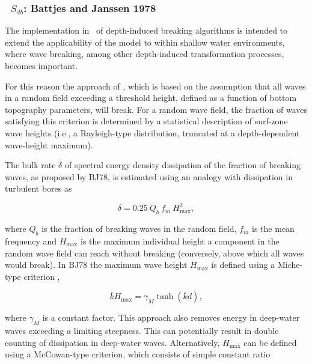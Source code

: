 \vsssub
\subsubsection{~$S_{db}$: Battjes and  Janssen 1978} \label{sec:DB1}
\vsssub


\noindent
The implementation in \ws\ of depth-induced breaking algorithms is intended to
extend the applicability of the model to within shallow water environments,
where wave breaking, among other depth-induced transformation processes,
becomes important.

For this reason the approach of \citet[][henceforth denoted as
BJ78]{pro:BJ78}, which is based on the assumption that all waves in a random
field exceeding a threshold height, defined as a function of bottom topography
parameters, will break. For a random wave field, the fraction of waves
satisfying this criterion is determined by a statistical description of
surf-zone wave heights (i.e., a Rayleigh-type distribution, truncated at a
depth-dependent wave-height maximum).

The bulk rate $\delta$ of spectral energy density dissipation of the fraction
of breaking waves, as proposed by BJ78, is estimated using an analogy with
dissipation in turbulent bores as


\begin{equation}
\delta = 0.25 \: Q_b \: f_m \: H_{\max}^2  , \label{eq:BJ78_base}
\end{equation}

\noindent
where $Q_b$ is the fraction of breaking waves in the random field, $f_m$ is
the mean frequency and $H_{\max}$ is the maximum individual height a component
in the random wave field can reach without breaking (conversely, above which
all waves would break). In BJ78 the maximum wave height $H_{\max}$ is defined
using a Miche-type criterion \citep{art:Miche44},


\begin{equation}
\bar{k} H_{\max} = \gamma_M \tanh ( \bar{k} d )
 , \label{eq:BJ78_Miche}
\end{equation}

\noindent
where $\gamma_M$ is a constant factor. This approach also removes energy in
deep-water waves exceeding a limiting steepness. This can potentially result
in double counting of dissipation in deep-water waves. Alternatively,
$H_{\max}$ can be defined using a McCowan-type criterion, which consists of
simple constant ratio

